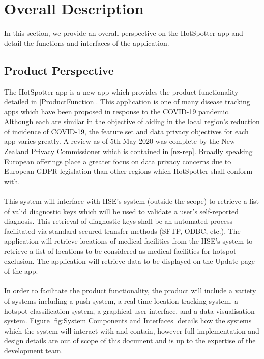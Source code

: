 \documentclass{scrreprt}
\begin{document}
\chapter{Overall Description}\label{Overall Description}
In this section, we provide an overall perspective on the HotSpotter app and detail the functions and interfaces of the application.\\

\section{Product Perspective}\label{ProductPerspective}
The HotSpotter app is a new app which provides the product functionality detailed in \ref{ProductFunction}. This application is one of many disease tracking apps which have been proposed in response to the COVID-19 pandemic. Although each are similar in the objective of aiding in the local region's reduction of incidence of COVID-19, the feature set and data privacy objectives for each app varies greatly. A review as of 5th May 2020 was complete by the New Zealand Privacy Commissioner which is contained in \ref{nz-rep}. Broadly speaking European offerings place a greater focus on data privacy concerns due to European GDPR legislation than other regions which HotSpotter shall conform with.\\
\\
This system will interface with HSE's system (outside the scope) to retrieve a list of valid diagnostic keys which will be used to validate a user's self-reported diagnosis. This retrieval of diagnostic keys shall be an automated process facilitated via standard secured transfer methods (SFTP, ODBC, etc.). The application will retrieve locations of medical facilities from the HSE's system to retrieve a list of locations to be considered as medical facilities for hotspot exclusion. The application will retrieve data to be displayed on the Update page of the app.\\
\\
In order to facilitate the product functionality, the product will include a variety of systems including a push system, a real-time location tracking system, a hotspot classification system, a graphical user interface, and a data visualisation system. Figure \ref{fig:System Components and Interfaces} details how the systems which the system will interact with and contain, however full implementation and design details are out of scope of this document and is up to the expertise of the development team.\\
\end{document}
